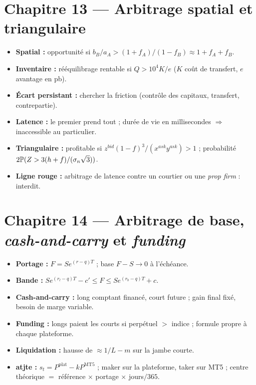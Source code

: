 \section*{Chapitre 13 — Arbitrage spatial et triangulaire}
\begin{itemize}[leftmargin=1.2em,itemsep=0.05em]
\item \textbf{Spatial :} opportunité si $b_B/a_A > (1+f_A)/(1-f_B)\approx1+f_A+f_B$.
\item \textbf{Inventaire :} rééquilibrage rentable si $Q > 10^4K/e$ ($K$ coût de transfert, $e$ avantage en pb).
\item \textbf{Écart persistant :} chercher la friction (contrôle des capitaux, transfert, contrepartie).
\item \textbf{Latence :} le premier prend tout ; durée de vie en millisecondes $\Rightarrow$ inaccessible au particulier.
\item \textbf{Triangulaire :} profitable si $z^{bid}(1-f)^3/(x^{ask}y^{ask}) > 1$ ; probabilité $2\mathbb{P}(Z > 3(h+f)/(\sigma_n\sqrt3))$.
\item \textbf{Ligne rouge :} arbitrage de latence contre un courtier ou une \emph{prop firm} : interdit.
\end{itemize}

\section*{Chapitre 14 — Arbitrage de base, \emph{cash-and-carry} et \emph{funding}}
\begin{itemize}[leftmargin=1.2em,itemsep=0.05em]
\item \textbf{Portage :} $F = Se^{(r-q)T}$ ; base $F - S\to0$ à l'échéance.
\item \textbf{Bande :} $Se^{(r_l-q)T} - c' \le F \le Se^{(r_b-q)T} + c$.
\item \textbf{Cash-and-carry :} long comptant financé, court future ; gain final fixé, besoin de marge variable.
\item \textbf{Funding :} longs paient les courts si perpétuel $>$ indice ; formule propre à chaque plateforme.
\item \textbf{Liquidation :} hausse de $\approx 1/L - m$ sur la jambe courte.
\item \textbf{atjte :} $s_t = P^{\text{plat}} - kP^{\text{MT5}}$ ; maker sur la plateforme, taker sur MT5 ; centre théorique $=$ référence $\times$ portage $\times$ jours$/365$.
\end{itemize}

